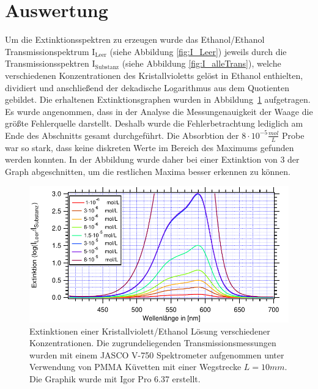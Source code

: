 \section{Auswertung}

Um die Extinktionsspektren zu erzeugen wurde das Ethanol/Ethanol Transmissionspektrum $\text{I}_{\text{Leer}}$ (siehe Abbildung \ref{fig:I_Leer}) jeweils durch die Transmissionsspektren $\text{I}_{\text{Substanz}}$ (siehe Abbildung \ref{fig:I_alleTrans}), welche verschiedenen Konzentrationen des Kristallvioletts gelöst in Ethanol enthielten, dividiert und anschließend der dekadische Logarithmus aus dem Quotienten gebildet. Die erhaltenen Extinktionsgraphen wurden in Abbildung~\ref{fig:Extinktionalle} aufgetragen. Es wurde angenommen, dass in der Analyse die Messungenauigkeit der Waage die größte Fehlerquelle darstellt. Deshalb wurde die Fehlerbetrachtung lediglich am Ende des Abschnitts gesamt durchgeführt. Die Absorbtion der $8 \cdot 10^{-5} \frac{mol}{L}$ Probe war so stark, dass keine diskreten Werte im Bereich des Maximums gefunden werden konnten. In der Abbildung wurde daher bei einer Extinktion von 3 der Graph abgeschnitten, um die restlichen Maxima besser erkennen zu können.
\begin{figure}[H]
	\centering	
	\begin{minipage}{1\textwidth}
	\includegraphics[width=\columnwidth]{Rohdaten/alleExtinktionenzusammen.pdf}	
	\caption{Extinktionen einer Kristallviolett/Ethanol Lösung verschiedener Konzentrationen. Die zugrundeliegenden Transmissionsmessungen wurden mit einem JASCO V-750 Spektrometer aufgenommen unter Verwendung von PMMA Küvetten mit einer Wegstrecke $L=10 \si{mm}$. Die Graphik wurde mit Igor Pro 6.37 erstellt.}
	\label{fig:Extinktionalle}
	\end{minipage}
	
\end{figure}


